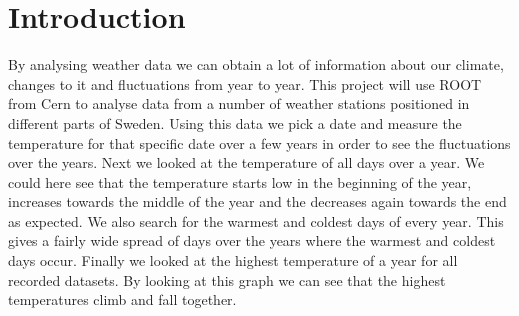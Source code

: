\documentclass[../main.tex]{subfiles}
\begin{document}
	\section{Introduction}
		By analysing weather data we can obtain a lot of information about our climate, changes to it and fluctuations from year to year. This project will use ROOT from Cern to analyse data from a number of weather stations positioned in different parts of Sweden. Using this data we pick a date and measure the temperature for that specific date over a few years in order to see the fluctuations over the years. Next we looked at the temperature of all days over a year. We could here see that the temperature starts low in the beginning of the year, increases towards the middle of the year and the decreases again towards the end as expected. We also search for the warmest and coldest days of every year. This gives a fairly wide spread of days over the years where the warmest and coldest days occur. Finally we looked at the highest temperature of a year for all recorded datasets. By looking at this graph we can see that the highest temperatures climb and fall together. 
\end{document}
